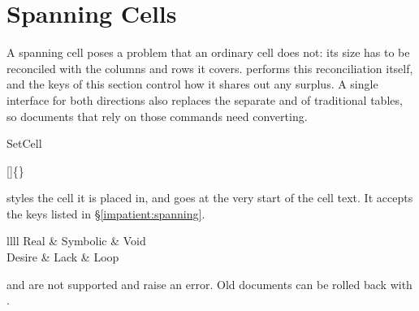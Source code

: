 \section{Spanning Cells}\label{inner:spanning}
A spanning cell poses a problem that an ordinary cell does not: its size has to be reconciled with the columns and rows it covers.  performs this reconciliation itself, and the keys of this section control how it shares out any surplus. A single interface for both directions also replaces the separate  and  of traditional tables, so documents that rely on those commands need converting.

\begin{codedescribe}[
    code,
    new=2021C,
    update=2021L
  ]{SetCell}
  \begin{codesyntax}
    []\{\} 
  \end{codesyntax}
   styles the cell it is placed in, and goes at the very start of the cell text. It accepts the keys listed in \S\ref{impatient:spanning}.

  \begin{codestore}[st=span:setcell]
    \begin{tblr}{llll}
      \hline
      Real   &  Symbolic & Void \\
      \hline
      Desire &  Lack         & Loop \\
      \hline
    \end{tblr}\end{codestore}
  \begin{center}
  \end{center}
  \begin{tsremark}
     and  are not supported and raise an error. Old documents can be rolled back with \tsverb*{\usepackage{tabularray}[=v2021]}.
  \end{tsremark}
\end{codedescribe}

